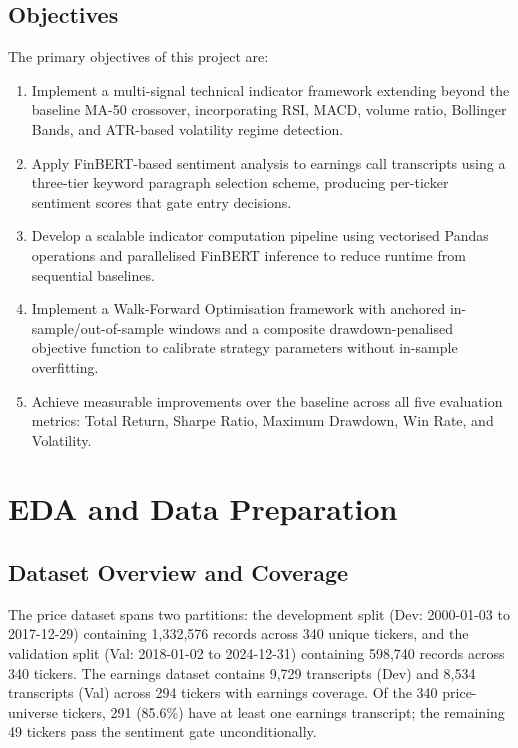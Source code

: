 \documentclass[11pt,twoside,a4paper]{article}
\begin{document}
\subsection{Objectives}

The primary objectives of this project are:
\begin{enumerate}[(1)]
    \item Implement a multi-signal technical indicator framework extending beyond the baseline MA-50 crossover, incorporating RSI, MACD, volume ratio, Bollinger Bands, and ATR-based volatility regime detection.
    \item Apply FinBERT-based sentiment analysis to earnings call transcripts using a three-tier keyword paragraph selection scheme, producing per-ticker sentiment scores that gate entry decisions.
    \item Develop a scalable indicator computation pipeline using vectorised Pandas operations and parallelised FinBERT inference to reduce runtime from sequential baselines.
    \item Implement a Walk-Forward Optimisation framework with anchored in-sample/out-of-sample windows and a composite drawdown-penalised objective function to calibrate strategy parameters without in-sample overfitting.
    \item Achieve measurable improvements over the baseline across all five evaluation metrics: Total Return, Sharpe Ratio, Maximum Drawdown, Win Rate, and Volatility.
\end{enumerate}

\clearpage
\section{EDA and Data Preparation}

\subsection{Dataset Overview and Coverage}

The price dataset spans two partitions: the development split (Dev: 2000-01-03 to 2017-12-29) containing 1,332,576 records across 340 unique tickers, and the validation split (Val: 2018-01-02 to 2024-12-31) containing 598,740 records across 340 tickers. The earnings dataset contains 9,729 transcripts (Dev) and 8,534 transcripts (Val) across 294 tickers with earnings coverage. Of the 340 price-universe tickers, 291 (85.6\%) have at least one earnings transcript; the remaining 49 tickers pass the sentiment gate unconditionally.
\end{document}
